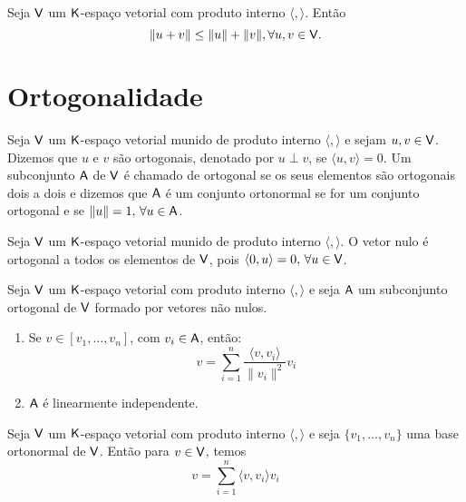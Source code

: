 \documentclass[10pt,a4paper]{book}
\begin{document}
\begin{corollary}
	Seja $\mathsf{ V }$ um $\mathsf{ K }$-espaço vetorial com produto interno $\langle, \rangle$. Então
\[
	\lVert u +  v \rVert \leq \lVert u \rVert  + \lVert v \rVert, \forall u, v\in \mathsf{ V }.
\]
\end{corollary}




\section{Ortogonalidade}

\begin{definition}[Ortogonalidade]
	Seja $\mathsf{ V }$ um $\mathsf{ K }$-espaço vetorial munido de produto interno $\langle , \rangle$ e sejam $u, v \in \mathsf{ V }$. Dizemos que $u$ e $v$ são ortogonais, denotado por $u \perp v$, se $\langle u , v \rangle = 0$. Um subconjunto $\mathsf{ A }$ de $\mathsf{ V }$ é chamado de ortogonal se os seus elementos são ortogonais dois a dois e dizemos que $\mathsf{ A }$ é um conjunto ortonormal se for um conjunto ortogonal e se $\lVert u \rVert = 1, \, \forall u \in \mathsf{ A }$.
\end{definition}

\begin{lemma}
	Seja $\mathsf{ V }$ um $\mathsf{ K }$-espaço vetorial munido de produto interno $\langle , \rangle$. O vetor nulo é ortogonal a todos os elementos de $\mathsf{ V }$, pois $\langle 0, u \rangle = 0, \, \forall u \in \mathsf{ V }$.
\end{lemma}


\begin{proposition}
	Seja $\mathsf{ V }$ um $\mathsf{ K }$-espaço vetorial com produto interno $\langle, \rangle$ e seja $\mathsf{ A }$ um subconjunto ortogonal de $\mathsf{ V }$ formado por vetores não nulos.
	\begin{enumerate}[label=(\alph*)]
		\item Se $v \in [ v_1, \dots, v_n ]$, com $v_i \in \mathsf{ A }$, então:
		\[
			v = \sum_{i = 1}^{n} \frac{\langle v, v_i \rangle}{\lVert v_i \rVert ^ 2}v_i
		\]
		\item $\mathsf{ A }$ é linearmente independente.
	\end{enumerate}
\end{proposition}

\begin{corollary}
	Seja $\mathsf{ V }$ um $\mathsf{ K }$-espaço vetorial com produto interno $\langle, \rangle$ e seja $\{ v_1, \dots, v_n \}$ uma base ortonormal de $\mathsf{ V }$. Então para $v \in \mathsf{ V }$, temos
	\[
		v = \sum_{i = 1}^{n} \langle v, v_i \rangle v_i
	\]
\end{corollary}
\end{document}
